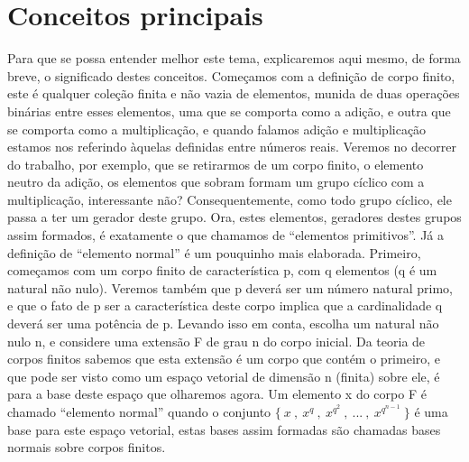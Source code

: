 \documentclass[12pt,twoside]{article}
\begin{document}

  \section{Conceitos principais}
    Para que se possa entender melhor este tema, explicaremos aqui mesmo, de
    forma breve, o significado destes conceitos. Começamos com a definição de corpo
    finito, este é qualquer coleção finita e não vazia de elementos, munida de duas
    operações binárias entre esses elementos, uma que se comporta como a adição, e
    outra que se comporta como a multiplicação, e quando falamos adição e
    multiplicação estamos nos referindo àquelas definidas entre números reais. Veremos
    no decorrer do trabalho, por exemplo, que se retirarmos de um corpo finito, o
    elemento neutro da adição, os elementos que sobram formam um grupo cíclico com
    a multiplicação, interessante não? Consequentemente, como todo grupo cíclico, ele
    passa a ter um gerador deste grupo. Ora, estes elementos, geradores destes grupos
    assim formados, é exatamente o que chamamos de ``elementos primitivos''. Já a
    definição de ``elemento normal'' é um pouquinho mais elaborada. Primeiro,
    começamos com um corpo finito de característica p, com q elementos (q é um
    natural não nulo). Veremos também que p deverá ser um número natural primo, e
    que o fato de p ser a característica deste corpo implica que a cardinalidade q deverá
    ser uma potência de p. Levando isso em conta, escolha um natural não nulo n, e
    considere uma extensão F de grau n do corpo inicial. Da teoria de corpos finitos
    sabemos que esta extensão é um corpo que contém o primeiro, e que pode ser visto
    como um espaço vetorial de dimensão n (finita) sobre ele, é para a base deste
    espaço que olharemos agora. Um elemento x do corpo F é chamado ``elemento normal'' quando o 
    conjunto $\{ \ x \ , \ x^{q} \ , \ x^{q^{2}} \ , \ ... \ , \ x^{q^{n-1}} \ \}$ é uma base 
    para este espaço vetorial, estas bases assim formadas são chamadas bases 
    normais sobre corpos finitos. \\
    

\end{document}
